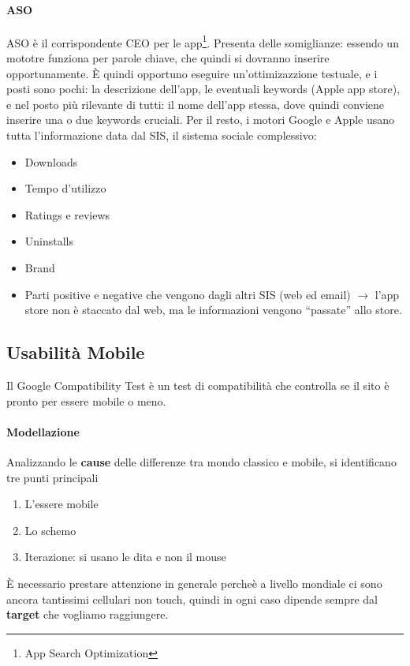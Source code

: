 \paragraph*{ASO}ASO \`e il corrispondente CEO per le app\footnote{App Search Optimization}. Presenta delle somiglianze: essendo un mototre funziona per parole chiave, che quindi si dovranno inserire opportunamente. \`E quindi opportuno eseguire un'ottimizazzione testuale, e i posti sono pochi: la descrizione dell'app, le eventuali keywords (Apple app store), e nel posto pi\`u rilevante di tutti: il nome dell'app stessa, dove quindi conviene inserire una o due keywords cruciali. Per il resto, i motori Google e Apple usano tutta l'informazione data dal SIS, il sistema sociale complessivo:
\begin{itemize}

\item Downloads
\item Tempo d'utilizzo
\item Ratings e reviews
\item Uninstalls
\item Brand
\item Parti positive e negative che vengono dagli altri SIS (web ed email) $\to$ l'app store non \`e staccato dal web, ma le informazioni vengono ``passate'' allo store.
  
\end{itemize}

\subsection{Usabilit\`a Mobile}

Il Google Compatibility Test \`e un test di compatibilit\`a che controlla se il sito \`e pronto per essere mobile o meno.

\paragraph*{Modellazione}Analizzando le \textbf{cause} delle differenze tra mondo classico e mobile, si identificano tre punti principali
\begin{enumerate}
  
\item L'essere mobile
\item Lo schemo
\item Iterazione: si usano le dita e non il mouse
  
\end{enumerate}
\`E necessario prestare attenzione in generale perche\`e a livello mondiale ci sono ancora tantissimi cellulari non touch, quindi in ogni caso dipende sempre dal \textbf{target} che vogliamo raggiungere.


